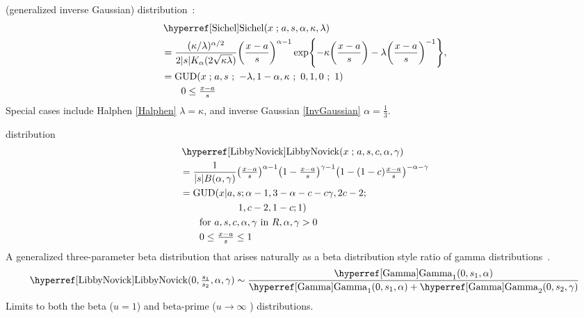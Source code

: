  (generalized inverse Gaussian) distribution~\cite{Good1953, Sichel1973, Barndorff-Nielsen1977}:
\begin{align}
\label{Sichel}
&\opr{Sichel}(x\given a,s, \alpha, \kappa, \lambda) 
\\
&= \frac{(\kappa/\lambda)^{\alpha/2} }{2 |s| K_{\alpha} (2\sqrt{\kappa\lambda})} \Left(\frac{x-a}{s}\Right)^{\alpha-1} 
\exp\Left\{-\kappa \Left(\frac{x-a}{s}\Right) -\lambda \Left(\frac{x-a}{s}\Right)^{-1}\Right\},
\notag
\checked
\\
& = \op{GUD}(x \given a,s \sep -\lambda, 1-\alpha , \kappa \sep 0,1,0 \sep 1)
\checked
\notag
\\& \qquad  0 \leq \tfrac{x-a}{s} \notag
\end{align}
Special cases include Halphen \eqref{Halphen} $\lambda= \kappa$, and inverse Gaussian \eqref{InvGaussian} $\alpha = \tfrac{1}{3}$. 




 distribution~\cite{Libby1982a, McDonald1995, Sarabia2006, Nadarajah2007}
\begin{align}
\label{LibbyNovick}
&\opr{LibbyNovick}(x\given a,s,c,\alpha,\gamma) 
\\ \notag
&=  \frac{1}{|s| B(\alpha,\gamma)}
\Left(\tfrac{x-a}{s}\Right)^{\alpha-1}  \Left(1-\tfrac{x-a}{s}\Right)^{\gamma-1} \Left(1- (1-c) \tfrac{x-a}{s}\Right)^{-\alpha-\gamma}
\checked
\notag
\\ \notag
& = \op{GUD}(x|a,s; \alpha-1, 3-\alpha - c - c\gamma, 2c-2; 
\\ \notag & \qquad\qquad\qquad 1, c-2, 1-c;1) \checked
\\ \notag
& \qquad \text{for } a,s,c,\alpha,\gamma  \text{ in } {R},  \alpha,\gamma  >0
\\ \notag
& \qquad 0\leq \tfrac{x-a}{s} \leq1
\end{align}
A generalized three-parameter beta distribution that arises naturally as a beta distribution style ratio of gamma distributions~\cite{Sarabia2006}. 
\[
\opr{LibbyNovick}(0, \tfrac{s_1}{s_2}, \alpha, \gamma) \sim \frac{\opr{Gamma}_1(0, s_1,\alpha)} { \opr{Gamma}_1(0, s_1,\alpha) + \opr{Gamma}_2(0, s_2,\gamma) }
\notag
\checked
\]
Limits to both the beta ($u=1$) and beta-prime ($u\rightarrow \infty$ ) distributions. 

